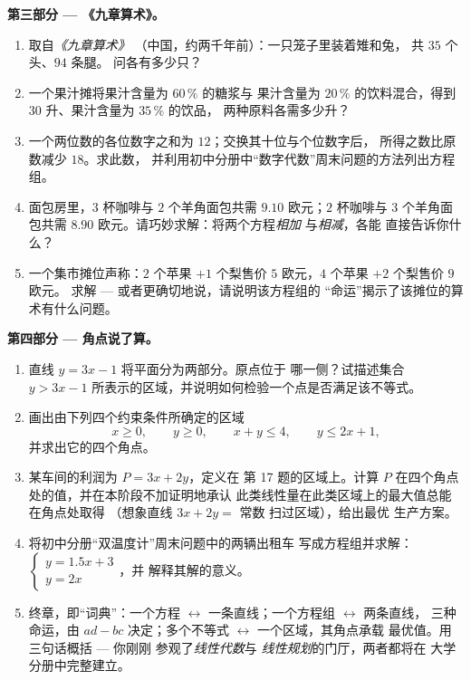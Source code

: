 \begin{problem}
\medskip
\noindent\textbf{第三部分 --- 《九章算术》。}
\begin{enumerate}[resume]
  \item 取自\emph{《九章算术》}
        （中国，约两千年前）：一只笼子里装着雉和兔，
        共 $35$ 个头、$94$ 条腿。
        问各有多少只？
  \item 一个果汁摊将果汁含量为 $60\,\%$ 的糖浆与
        果汁含量为 $20\,\%$ 的饮料混合，得到 $30$ 升、果汁含量为 $35\,\%$ 的饮品，
        两种原料各需多少升？
  \item 一个两位数的各位数字之和为 $12$；交换其十位与个位数字后，
        所得之数比原数减少 $18$。求此数，
        并利用初中分册中“数字代数”周末问题的方法列出方程组。
  \item 面包房里，$3$ 杯咖啡与 $2$ 个羊角面包共需
        $9.10$ 欧元；$2$ 杯咖啡与 $3$ 个羊角面包共需
        $8.90$ 欧元。请巧妙求解：将两个方程\emph{相加}
        与\emph{相减}，各能
        直接告诉你什么？
  \item 一个集市摊位声称：$2$ 个苹果 $+ 1$ 个梨售价
        $5$ 欧元，$4$ 个苹果 $+ 2$ 个梨售价 $9$ 欧元。
        求解 --- 或者更确切地说，请说明该方程组的
        “命运”揭示了该摊位的算术有什么问题。
\end{enumerate}

\medskip
\noindent\textbf{第四部分 --- 角点说了算。}
\begin{enumerate}[resume]
  \item 直线 $y = 3x - 1$ 将平面分为两部分。原点位于
        哪一侧？试描述集合
        $y > 3x - 1$ 所表示的区域，并说明如何检验一个点是否满足该不等式。
  \item 画出由下列四个约束条件所确定的区域
        \[
        x \geq 0, \qquad y \geq 0, \qquad x + y \leq 4,
        \qquad y \leq 2x + 1,
        \]
        并求出它的四个角点。
  \item 某车间的利润为 $P = 3x + 2y$，定义在
        第 17 题的区域上。计算 $P$ 在四个角点处的值，并在本阶段不加证明地承认
        此类线性量在此类区域上的最大值总能在角点处取得
        （想象直线
        $3x + 2y = $ 常数 扫过区域），给出最优
        生产方案。
  \item 将初中分册“双温度计”周末问题中的两辆出租车
        写成方程组并求解：
        $\begin{cases} y = 1.5x + 3 \\ y = 2x \end{cases}$，并
        解释其解的意义。
  \item 终章，即“词典”：一个方程 $\leftrightarrow$
        一条直线；一个方程组 $\leftrightarrow$ 两条直线，
        三种命运，由 $ad - bc$ 决定；多个不等式
        $\leftrightarrow$ 一个区域，其角点承载
        最优值。用三句话概括 --- 你刚刚
        参观了\emph{线性代数}与
        \emph{线性规划}的门厅，两者都将在
        大学分册中完整建立。
\end{enumerate}
\end{problem}
